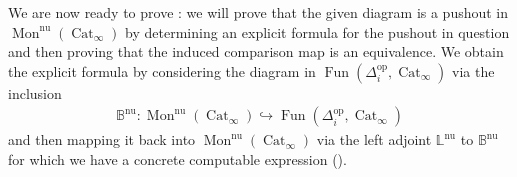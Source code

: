 \documentclass[12pt, reqno]{amsart}
\theoremstyle{plain}
\theoremstyle{definition}
\begin{document}
We are now ready to prove : we will prove that the given diagram is a pushout in $\operatorname{Mon}^{\operatorname{nu}}(\operatorname{Cat}_\infty)$ by determining an explicit formula for the pushout in question and then proving that the induced comparison map is an equivalence. We obtain the explicit formula by  considering the diagram in $\operatorname{Fun}(\Delta^{\operatorname{op}}_i, \operatorname{Cat}_\infty)$ via the inclusion
\begin{align*}
\mathbb{B}^{\operatorname{nu}}\colon \operatorname{Mon}^{\operatorname{nu}}(\operatorname{Cat}_\infty)\hookrightarrow \operatorname{Fun}(\Delta^{\operatorname{op}}_i, \operatorname{Cat}_\infty)
\end{align*}
and then mapping it back into $\operatorname{Mon}^{\operatorname{nu}}(\operatorname{Cat}_\infty)$ via the left adjoint $\mathbb{L}^{\operatorname{nu}}$ to $\mathbb{B}^{\operatorname{nu}}$ for which we have a concrete computable expression (). 
\end{document}
